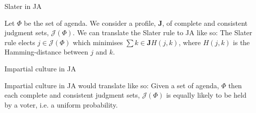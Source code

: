 \documentclass[12pt]{article}
\newenvironment{answer}[2][Answer]{\begin{trivlist}
\item[\hskip \labelsep {\bfseries #1}\hskip \labelsep {\bfseries #2:}]}{\end{trivlist}}
\begin{document}
\begin{answer}{d)}{Slater in JA}

Let $\Phi$ be the set of agenda. We consider a profile, $\boldsymbol{J}$, of complete and consistent judgment sets, $\mathcal{J}(\Phi)$. We can translate the Slater rule to JA like so: The Slater rule elects $j \in \mathcal{J}(\Phi)$ which minimises $\sum{k \in \boldsymbol{J}}{}{H(j,k)}$, where $H(j,k)$ is the Hamming-distance between $j$ and $k$.

\end{answer}
\begin{answer}{e)}{Impartial culture in JA}

Impartial culture in JA would translate like so: Given a set of agenda, $\Phi$ then each complete and consistent judgment sets, $\mathcal{J}(\Phi)$ is equally likely to be held by a voter, i.e. a uniform probability.
\end{answer}
\end{document}
